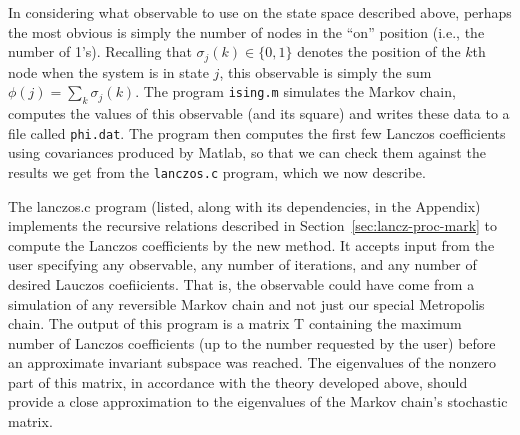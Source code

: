 \documentclass[12pt,letterpaper]{report}
\theoremstyle{plain}
\theoremstyle{definition}
\theoremstyle{remark}
\numberwithin{theorem}{chapter}
\numberwithin{claim}{chapter}
\numberwithin{equation}{chapter}
\numberwithin{conjecture}{chapter}
\newcommand\<{\ensuremath{\langle}}
\renewcommand\>{\ensuremath{\rangle}}
\begin{document}
In considering what observable to use on the state space described above, perhaps the
most obvious is simply the number of nodes in the ``on'' position (i.e., the
number of 1's). Recalling that $\sigma_j(k)\in \{0,1\}$ denotes the position of
the $k$th node when the system is in state $j$, this observable is simply the
sum $\phi(j) = \sum_k\sigma_j(k)$. 
The program {\tt ising.m} simulates the Markov chain, computes the
values of this observable (and its square) and writes these data to a file
called {\tt phi.dat}. 
The program then computes the first few Lanczos coefficients using covariances
produced by Matlab, so that we can check them against the results we get from the
{\tt lanczos.c} program, which we now describe.

The lanczos.c program (listed, along with its dependencies, in the Appendix) implements
the recursive relations described in Section~\ref{sec:lancz-proc-mark} %
to compute the Lanczos coefficients by the new
method. It accepts input from the user specifying any observable, any number of
iterations, and any 
%
%
%
%
number of desired Lauczos coefiicients. That is, the observable could have come from a simulation
of any reversible Markov chain and not just our special Metropolis chain. The output of this
program is a matrix T containing the maximum number of Lanczos coefficients (up
to the number requested by the user) before an approximate invariant subspace
was reached. The eigenvalues of the nonzero part of this matrix, in accordance
with the theory developed above, should provide a close approximation to the
eigenvalues of the Markov chain's stochastic matrix.
\end{document}
